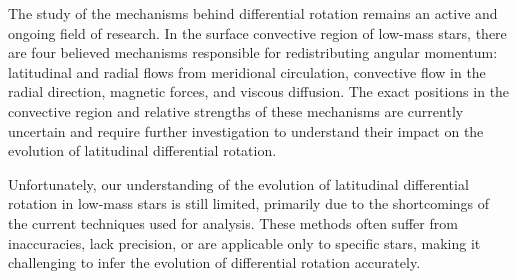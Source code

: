 %


The study of the mechanisms behind differential rotation remains an active and ongoing field of research. 
In the surface convective region of low-mass stars, there are four believed mechanisms responsible for redistributing angular momentum: latitudinal and radial flows from meridional circulation, convective flow in the radial direction, magnetic forces, and viscous diffusion. 
The exact positions in the convective region and relative strengths of these mechanisms are currently uncertain and require further investigation to understand their impact on the evolution of latitudinal differential rotation.

Unfortunately, our understanding of the evolution of latitudinal differential rotation in low-mass stars is still limited, primarily due to the shortcomings of the current techniques used for analysis. These methods often suffer from inaccuracies, lack precision, or are applicable only to specific stars, making it challenging to infer the evolution of differential rotation accurately.

